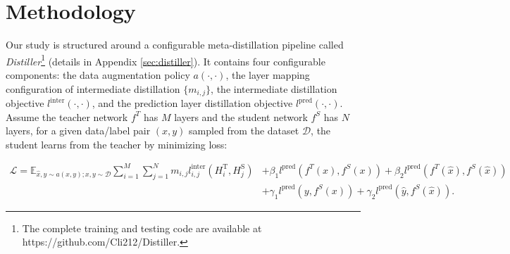 \documentclass[11pt]{article}
\newcommand{\showcomments}{yes}
\newcommand\szha[1]{
    \ifthenelse{\equal{\showcomments}{yes}}{{\color{orange} Sheng: #1}}{\ignorespaces}}
\begin{document}
\vspace{-0.5em}
\section{Methodology}

\label{methodology}
Our study is structured around a configurable meta-distillation pipeline called \emph{Distiller}\footnote[1]{The complete training and testing code are available at https://github.com/Cli212/Distiller.} (details in Appendix \ref{sec:distiller}). It contains four configurable components: the data augmentation policy $a(\cdot, \cdot)$, the layer mapping configuration of intermediate distillation $\{m_{i, j}\}$,  the intermediate distillation objective  $l^{\text{inter}}(\cdot,\cdot)$, and the prediction layer distillation objective $l^{\text{pred}}(\cdot,\cdot)$. Assume the teacher network $f^T$ has $M$ layers and the student network $f^S$ has $N$ layers, for a given data/label pair $(x,y)$ sampled from the dataset $\mathcal{D}$, the student learns from the teacher by minimizing loss: 
\begin{footnotesize}
\begin{equation}
\label{eq:objective}
\begin{aligned}
    \mathcal{L} = \mathbb{E}_{\hat{x}, \hat{y} \sim a(x, y); x, y \sim \mathcal{D}} \sum_{i=1}^M \sum_{j=1}^N m_{i,j}l_{i,j}^{\text{inter}}(H_i^{\text{T}},H_j^{\text{S}})
    &+ \beta_1 l^{\text{pred}}(f^{T}(x),f^{S}(x))
    + \beta_2 l^{\text{pred}}(f^{T}(\hat{x}),f^{S}(\hat{x}))\\
    &+ \gamma_1 l^{\text{pred}}(y, f^{S}(x)) 
    + \gamma_2 l^{\text{pred}}(\hat{y}, f^{S}(\hat{x})).
\end{aligned}
\end{equation}
\end{footnotesize}
\end{document}
